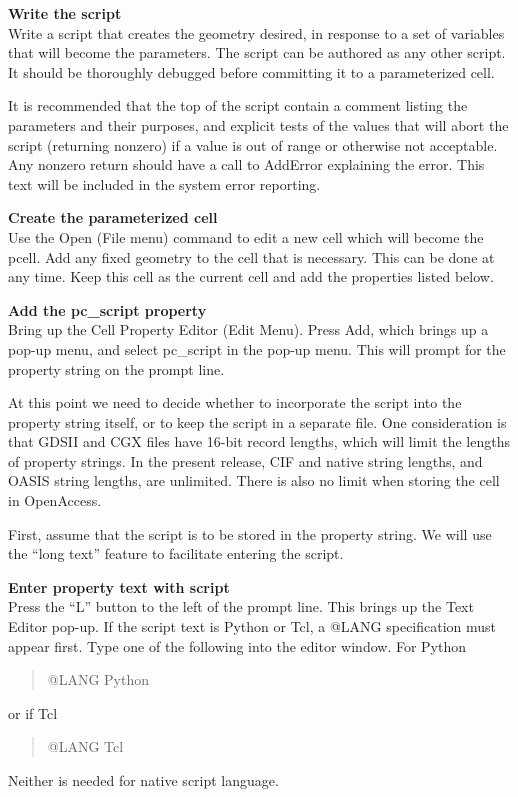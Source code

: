 \begin{description}
\item{\bf Write the script}\\
Write a script that creates the geometry desired, in response
to a set of variables that will become the parameters.  The script
can be authored as any other script.  It should be thoroughly
debugged before committing it to a parameterized cell.

It is recommended that the top of the script contain a comment listing
the parameters and their purposes, and explicit tests of the values
that will abort the script (returning nonzero) if a value is out of
range or otherwise not acceptable.  Any nonzero return should have a
call to {\vt AddError} explaining the error.  This text will be
included in the system error reporting.

\item{\bf Create the parameterized cell}\\
Use the {\cb Open} ({\cb File menu}) command to edit a new cell which
will become the pcell.  Add any fixed geometry to the cell that is
necessary.  This can be done at any time.  Keep this cell as the
current cell and add the properties listed below.

\item{\bf Add the {\et pc\_script} property}\\
Bring up the {\cb Cell Property Editor} ({\cb Edit Menu}).  Press {\cb
Add}, which brings up a pop-up menu, and select {\cb pc\_script} in
the pop-up menu.  This will prompt for the property string on the
prompt line.

At this point we need to decide whether to incorporate the script
into the property string itself, or to keep the script in a separate
file.  One consideration is that GDSII and CGX files have 16-bit record
lengths, which will limit the lengths of property strings.  In the
present {\Xic} release, CIF and native string lengths, and
OASIS string lengths, are unlimited.
There is also no limit when storing the cell in OpenAccess.

First, assume that the script is to be stored in the property string. 
We will use the ``long text'' feature to facilitate entering the
script.

\item{\bf Enter property text with script}\\
Press the ``{\cb L}'' button to the left of the prompt line.  This
brings up the {\cb Text Editor} pop-up.  If the script text is Python
or Tcl, a {\vt @LANG} specification must appear first.  Type one of
the following into the editor window.  For Python
\begin{quote}
\vt @LANG Python
\end{quote}
or if Tcl
\begin{quote}
\vt @LANG Tcl
\end{quote}
Neither is needed for native script language.


\end{description}
